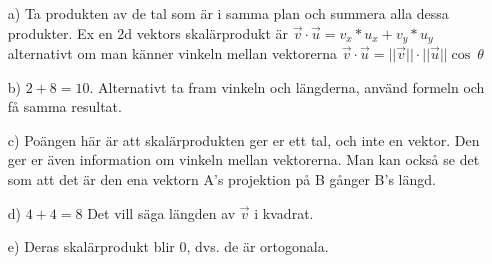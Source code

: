 \begin{itemize}
	\item [a) ] Ta produkten av de tal som är i samma plan och summera alla dessa produkter. Ex en 2d vektors skalärprodukt är $\vec{v} \cdot \vec{u} = v_{x}*u_{x}+v_{y}*u_{y} $ alternativt om man känner vinkeln mellan vektorerna $\vec{v} \cdot \vec{u} = ||\vec{v}||\cdot||\vec{u}||\cos\ \theta$
	\item [b) ] $2+8=10$. Alternativt ta fram vinkeln och längderna, använd formeln och få samma resultat. 
	\item [c) ] Poängen här är att skalärprodukten ger er ett tal, och inte en vektor. Den ger er även information om vinkeln mellan vektorerna. Man kan också se det som att det är den ena vektorn A's projektion på B gånger B's längd. 
	\item [d) ] $4+4=8$ Det vill säga längden av $\vec{v}$ i kvadrat.
	\item [e) ] Deras skalärprodukt blir 0, dvs. de är ortogonala.
\end{itemize}